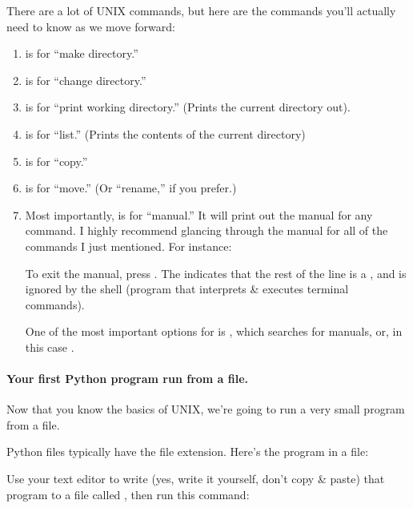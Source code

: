 
There are a lot of UNIX commands, but here are the commands you'll
actually need to know as we move forward:

\begin{enumerate}
\item {} is for ``make directory.''
\item {} is for ``change directory.''
\item {} is for ``print working directory.'' (Prints the
  current directory out).
\item {} is for ``list.'' (Prints the contents of the current
  directory)
\item {} is for ``copy.''
\item {} is for ``move.'' (Or ``rename,'' if you prefer.)
\item Most importantly,  is for ``manual.'' It will print
  out the manual for any command. I highly recommend glancing through
  the manual for all of the commands I just mentioned. For instance:


  To exit the manual, press . The \code{#} indicates that the
  rest of the line is a , and is ignored by the shell
  (program that interprets \& executes terminal commands).

  One of the most important options for  is ,
  which searches for manuals, or, in this case .

\end{enumerate}

\paragraph{Your first Python program run from a file.}

Now that you know the basics of UNIX, we're going to run a very small
program from a file.

Python files typically have the  file extension. Here's the
 program in a file:


Use your text editor to write (yes, write it yourself, don't copy \&
paste) that program to a file called , then run
this command:


